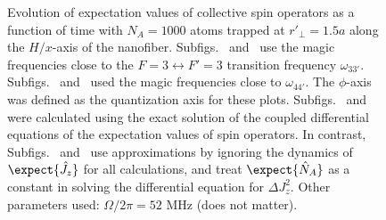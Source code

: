 \begin{figure}
\caption{Evolution of expectation values of collective spin operators as a function of time with $ N_A=1000 $ atoms trapped at $ r'\!_\perp =1.5a $ along the $ H/x $-axis of the nanofiber. Subfigs.~\protect{} and~\protect{} use the magic frequencies close to the $ F=3\leftrightarrow F'=3 $ transition frequency $ \omega_{33'} $. Subfigs.~\protect{} and~\protect{} used the magic frequencies close to $ \omega_{44'} $. The $ \phi $-axis was defined as the quantization axis for these plots. Subfigs.~\protect{} and~\protect{} were calculated using the exact solution of the coupled differential equations of the expectation values of spin operators. In contrast, Subfigs.~\protect{} and~\protect{} use approximations by ignoring the dynamics of $ \expect{\hat{J}_z} $ for all calculations, and treat $ \expect{\hat{N}_A} $ as a constant in solving the differential equation for $ \Delta J_z^2 $. Other parameters used: $ \Omega/2\pi=52 $ MHz (does not matter). }\label{fig:clockdynamics_m_yq_rp1d5}
\end{figure}

